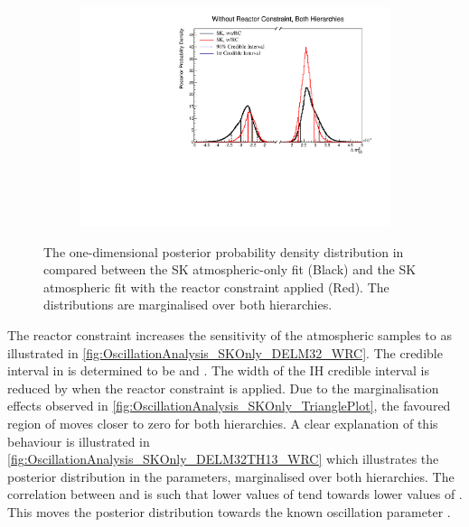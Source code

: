 \begin{figure}[h]
  \begin{subfigure}[t]{0.98\textwidth}
    \includegraphics[width=\textwidth, trim={0mm 0mm 0mm 0mm}, clip,page=1]{Figures/OA/SKOnlyFit_wRC/ContourComparison_1D_dm32_BH_2_wRC_woRC_UnSmeared_CredibleInterval.pdf}
  \end{subfigure}
  \caption{The one-dimensional posterior probability density distribution in  compared between the SK atmospheric-only fit (Black) and the SK atmospheric fit with the reactor constraint applied (Red). The distributions are marginalised over both hierarchies.}
  \label{fig:OscillationAnalysis_SKOnly_DELM32_WRC}
\end{figure}

The reactor constraint increases the sensitivity of the atmospheric samples to  as illustrated in \autoref{fig:OscillationAnalysis_SKOnly_DELM32_WRC}. The \quickmath{1\sigma} credible interval in  is determined to be  and . The width of the IH credible interval is reduced by  when the reactor constraint is applied. Due to the marginalisation effects observed in \autoref{fig:OscillationAnalysis_SKOnly_TrianglePlot}, the favoured region of  moves closer to zero for both hierarchies. A clear explanation of this behaviour is illustrated in \autoref{fig:OscillationAnalysis_SKOnly_DELM32TH13_WRC} which illustrates the posterior distribution in the  parameters, marginalised over both hierarchies. The correlation between  and  is such that lower values of  tend towards lower values of . This moves the posterior distribution towards the known oscillation parameter .

